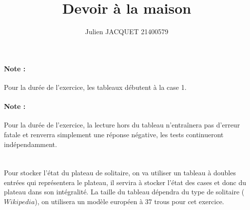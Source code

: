 \documentclass[a4paper]{article}
\title {Devoir à la maison}
\author{Julien JACQUET 21400579}
\begin{document}
  \maketitle
  \newpage
  \paragraph{Note :}
  Pour la durée de l'exercice, les tableaux débutent à la case 1.
  \paragraph{Note :}
  Pour la durée de l'exercice, la lecture hors du tableau n'entraînera pas d'erreur fatale et renverra simplement une réponse négative, les tests continueront indépendamment.

  \section{}
  Pour stocker l'état du plateau de solitaire, on va utiliser un tableau à doubles entrées qui représentera le plateau, il servira à stocker l'état des cases et donc du plateau dans son intégralité.
  La taille du tableau dépendra du type de solitaire ($Wikipedia$), on utilisera un  modèle européen à 37 trous pour cet exercice.
  
\end{document}
